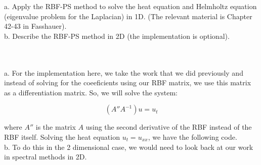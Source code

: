 a. Apply the RBF-PS method to solve the heat equation and Helmholtz equation (eigenvalue problem for the
Laplacian) in 1D. (The relevant material is Chapter 42-43 in Fasshauer).\\

b. Describe the RBF-PS method in 2D (the implementation is optional).\\\\

\begin{solution}\renewcommand{\qedsymbol}{}\ \\

    a. For the implementation here, we take the work that we did previously and instead of solving for
    the coeeficients using our RBF matrix, we use this matrix as a differentiation matrix. So, we will
    solve the system:
    
    $$(A'' A^{-1})u=u_t$$
    
    where $A''$ is the matrix $A$ using the second derivative of the RBF instead of the RBF itself.
    Solving the heat equation $u_t=u_{xx}$, we have the following code.\\

    b. To do this in the 2 dimensional case, we would need to look back at our work in spectral methods
    in 2D.

\end{solution}